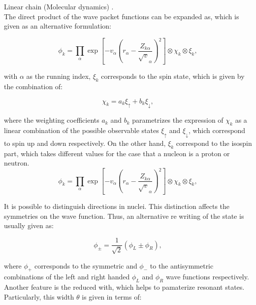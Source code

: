 \documentclass[openany]{book}
\begin{document}
Linear chain (Molecular dynamics) \cite{baba_taniguchi_kimura_2022}. \\

The direct product of the wave packet functions can be expanded as, which is given as an alternative formulation: 

\begin{equation}\label{eq:micro_linearChain_waveFunction}
	\phi_k = \prod_{\alpha} {\exp \left [- v_\alpha \left ( r_\alpha - \frac{Z_{k\alpha}}{\sqrt v_\alpha} \right )^2 \right]} \otimes \chi_k \otimes \xi_k,
\end{equation} 

with $\alpha$ as the running index, $\xi_k$ corresponds to the spin state, which is given by the combination of: 

\begin{equation}\label{eq:micro_linearChain_chi}
	\chi_k = a_k \xi_{\uparrow} + b_k \xi_\downarrow,
\end{equation} 

where the weighting coefficients $ a_k$ and $b_k $ parametrizes the expression of $\chi_k$ as a linear combination of the possible observable states $\xi_{\uparrow}  $ and $\xi_\downarrow$, which correspond to spin up and down respectively. On the other hand, $\xi_k$ correspond to the isospin part, which takes different values for the case that a nucleon is a proton or neutron. \\

\begin{equation}\label{eq:micro_linearChain}
	\phi_k = \prod_{\alpha} {\exp \left [- v_\alpha \left ( r_\alpha - \frac{Z_{k\alpha}}{\sqrt v_\alpha} \right )^2 \right]} \otimes \chi_k \otimes \xi_k,
\end{equation} 

It is possible to distinguish directions in nuclei. This distinction affects the symmetries on the wave function. Thus, an alternative re writing of the state is usually given as: 

\begin{equation}\label{eq:micro_linearChain_2state}
	\phi_\pm = \frac{1}{\sqrt{2}} (\phi_L \pm \phi_R),
\end{equation} 

where $\phi_+$ corresponds to the symmetric and $\phi_-$ to the antisymmetric combinations of the left and right handed $\phi_L$ and $\phi_R$ wave functions respectively.  \\

Another feature is the reduced with, which helps to pamaterize resonant states. Particularly, this width $\theta$ is given in terms of: 
\end{document}
